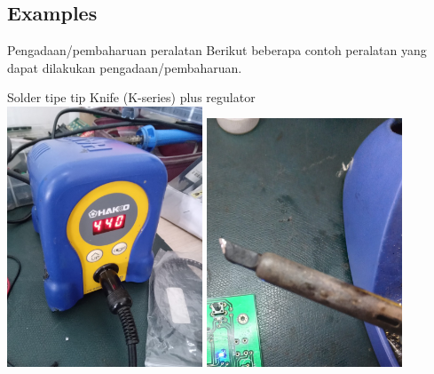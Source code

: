 \documentclass[table,dvipsnames]{beamer}
\begin{document}
	\subsection{Examples}
	\begin{frame}
		\begin{exampleblock}{Pengadaan/pembaharuan peralatan}
			Berikut beberapa contoh peralatan yang dapat dilakukan pengadaan/pembaharuan.
		\end{exampleblock}

		\begin{exampleblock}{Solder tipe tip Knife (K-series) plus regulator}
			\centering
			\includegraphics[width=165pt,angle=-90,origin=c]{images/solder0}
			\includegraphics[width=165pt,angle=-90,origin=c]{images/solder1}
		\end{exampleblock}
	\end{frame}
\end{document}
